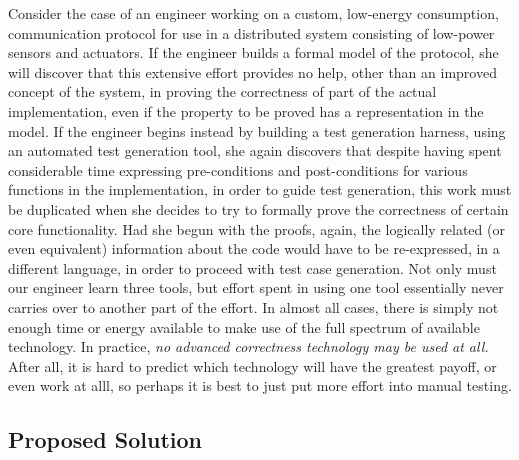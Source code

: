 Consider the case of an engineer working on a custom, low-energy consumption, communication protocol for use in a distributed system consisting of low-power sensors and actuators.  If the engineer builds a formal model of the protocol, she will discover that this extensive effort provides no help, other than an improved concept of the system, in proving the correctness of part of the actual implementation, even if the property to be proved has a representation in the model.  If the engineer begins instead by building a test generation harness, using an automated test generation tool, she again discovers that despite having spent considerable time expressing pre-conditions and post-conditions for various functions in the implementation, in order to guide test generation, this work must be duplicated when she decides to try to formally prove the correctness of certain core functionality.  Had she begun with the proofs, again, the logically related (or even equivalent) information about the code would have to be re-expressed, in a different language, in order to proceed with test case generation.  Not only must our engineer learn three tools, but effort spent in using one tool essentially never carries over to another part of the effort.  In almost all cases, there is simply not enough time or energy available to make use of the full spectrum of available technology.  In practice, \emph{no advanced correctness technology may be used at all.}  After all, it is hard to predict which technology will have the greatest payoff, or even work at alll, so perhaps it is best to just put more effort into manual testing.

\subsection{Proposed Solution}

